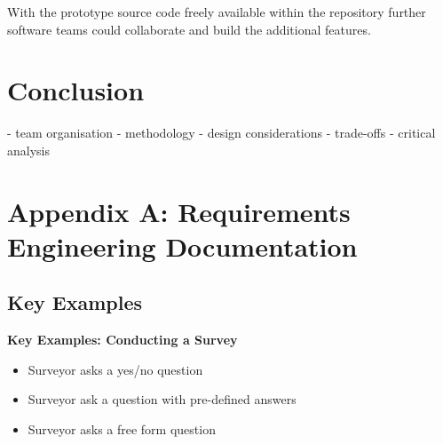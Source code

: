 \documentclass[12pt]{witseiepaper}
\begin{document}
With the prototype source code freely available within the repository further software teams could collaborate and build the additional features.

%
\section{Conclusion}

- team organisation
- methodology
- design considerations
- trade-offs
- critical analysis




%

\newpage
\newcommand{\summary}[1]{\addtocontents{toc}{#1\par}}
{}


\renewcommand{\bibname}{REFERENCES}
\renewcommand*{\bibfont}{\raggedright}




\newpage




\section{Appendix A: Requirements Engineering Documentation}

\subsection{Key Examples}

\textbf{Key Examples: Conducting a Survey}
\begin{itemize}
\item Surveyor asks a yes/no question 
\item Surveyor ask a question with pre-defined answers
\item Surveyor asks a free form question
\end{itemize}
\end{document}

